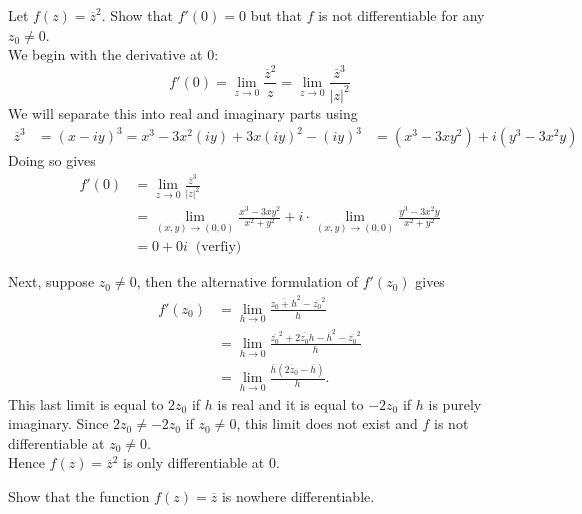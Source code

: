 \documentclass[handout]{ximera}
\begin{document}
\begin{example}
Let $f(z) = \overline{z}^2$.  Show that $f'(0) = 0$ but that $f$ is not differentiable for any $z_0 \neq 0$.\\
We begin with the derivative at $0$:
\[
f'(0) = \lim_{z \to  0} \frac{\overline{z}^2}{z} = \lim_{z \to  0} \frac{\overline{z}^3}{|z|^2}
\]
We will separate this into real and imaginary parts using 
\begin{align*}
\overline{z}^3 &= (x -iy)^3 = x^3 - 3x^2(iy) + 3x(iy)^2  - (iy)^3 
              &= (x^3 -3xy^2) + i(y^3 - 3x^2y)
\end{align*}
Doing so gives
\begin{align*}
f'(0) &= \lim_{z \to  0} \frac{\overline{z}^3}{|z|^2}\\
      &= \lim_{(x,y) \to (0,0)} \frac{x^3 -3xy^2}{x^2 +y^2} + i\cdot \lim_{(x,y) \to (0,0)} \frac{y^3 - 3x^2y}{x^2 +y^2}\\
      & = 0 + 0i \;\; \mbox{(verfiy)}
\end{align*}

Next, suppose $z_0 \neq 0$, then the alternative formulation of $f'(z_0)$ gives
\begin{align*}
f'(z_0) &= \lim_{h \to 0} \frac{\overline{z_0 + h}^2-\overline{z_0}^2 }{h}\\[6pt]
        &=\lim_{h \to 0} \frac{\overline{z_0}^2 +\overline{2z_0h}- \overline{h}^2 -\overline{z_0}^2 }{h}\\[6pt]
        &=\lim_{h \to 0} \frac{\overline{h} \left(\overline{2z_0}- \overline{h}\right)}{h}.
\end{align*}
This last limit is equal to $2z_0$ if $h$ is real and it is equal to $-2z_0$ if $h$ is purely imaginary.
Since $2z_0 \neq -2z_0$ if $z_0 \neq 0$, this limit does not exist and $f$ is not differentiable at $z_0 \neq 0$.\\
Hence $f(z) = \overline{z}^2$ is only differentiable at $0$.

\end{example}


\begin{problem}
Show that the function $f(z) = \overline{z}$ is nowhere differentiable.
\end{problem}
\end{document}
